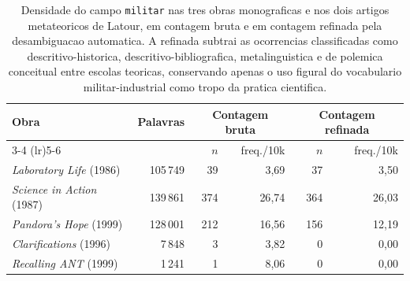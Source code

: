 \begin{table}[htbp]
\centering
\caption[Campo militar refinado, 5 obras de Latour]{Densidade do campo \texttt{militar} nas tres obras monograficas e nos dois artigos metateoricos de Latour, em contagem bruta e em contagem refinada pela desambiguacao automatica. A refinada subtrai as ocorrencias classificadas como descritivo-historica, descritivo-bibliografica, metalinguistica e de polemica conceitual entre escolas teoricas, conservando apenas o uso figural do vocabulario militar-industrial como tropo da pratica cientifica.}
\label{tab:militar-refinado-5-obras}
\small
\begin{tabular}{lrrrrr}
\toprule
Obra & Palavras & \multicolumn{2}{c}{Contagem bruta} & \multicolumn{2}{c}{Contagem refinada} \\
\cmidrule(lr){3-4} \cmidrule(lr){5-6}
 & & $n$ & freq./10k & $n$ & freq./10k \\
\midrule
\emph{Laboratory Life} (1986) & 105\,749 & 39 & 3{,}69 & 37 & 3{,}50 \\
\emph{Science in Action} (1987) & 139\,861 & 374 & 26{,}74 & 364 & 26{,}03 \\
\emph{Pandora's Hope} (1999) & 128\,001 & 212 & 16{,}56 & 156 & 12{,}19 \\
\midrule
\emph{Clarifications} (1996) & 7\,848 & 3 & 3{,}82 & 0 & 0{,}00 \\
\emph{Recalling ANT} (1999) & 1\,241 & 1 & 8{,}06 & 0 & 0{,}00 \\
\bottomrule
\end{tabular}
\end{table}
